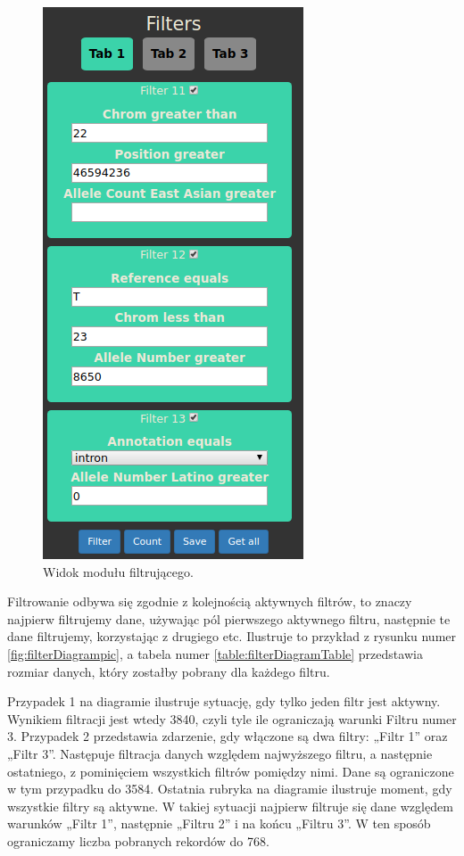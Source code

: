 \documentclass[a4paper,12pt,twoside]{article}
\begin{document}
\begin{figure}
\centering
\includegraphics[height=0.95\textheight]{obrazy/aplikacja/filters.png}
\caption{Widok modułu filtrującego.}
\label{fig:filterspic}
\end{figure}

\newpage

Filtrowanie odbywa się zgodnie z kolejnością aktywnych filtrów, to znaczy najpierw filtrujemy dane, używając pól pierwszego aktywnego filtru, następnie te dane filtrujemy, korzystając z drugiego etc. Ilustruje to przykład z rysunku numer \ref{fig:filterDiagrampic}, a tabela numer \ref{table:filterDiagramTable}
przedstawia rozmiar danych, który zostałby pobrany dla każdego filtru.

Przypadek 1 na diagramie ilustruje sytuację, gdy tylko jeden filtr jest aktywny.
Wynikiem filtracji jest wtedy 3840, czyli tyle ile ograniczają warunki Filtru numer 3.
Przypadek 2 przedstawia zdarzenie, gdy włączone są dwa filtry: „Filtr 1” oraz „Filtr 3”. Następuje filtracja danych względem najwyższego filtru, a następnie ostatniego,
z pominięciem wszystkich filtrów pomiędzy nimi.
Dane są ograniczone w tym przypadku do 3584.
Ostatnia rubryka na diagramie ilustruje moment, gdy wszystkie filtry są aktywne.
W takiej sytuacji najpierw filtruje się dane względem warunków „Filtr 1”,
następnie „Filtru 2” i na końcu „Filtru 3”. W ten sposób ograniczamy
liczba pobranych rekordów do 768.
\end{document}
